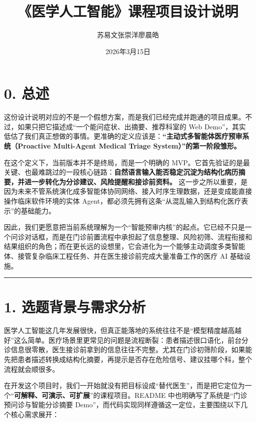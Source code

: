 \documentclass[
  chinese,
  12pt,
  UTF8,
  a4paper]{ctexart}
\title{《医学人工智能》课程项目设计说明}
\author{苏易文\quad 张崇洋\quad 廖晨皓}
\date{2026年3月15日}
\begin{document}
\maketitle

{
\setcounter{tocdepth}{2}
\tableofcontents
}
\section{0. 总述}\label{0-ux5148ux8bf4ux7ed3ux8bbaux6211ux4eecux7684ux7cfbux7edfux5230ux5e95ux505aux4e86ux4ec0ux4e48}

这份设计说明对应的不是一个假想方案，而是我们已经完成并跑通的项目成果。不过，如果只把它描述成``一个能问症状、出摘要、推荐科室的 Web Demo''，其实低估了我们真正想做的事情。更准确的定义应该是：\textbf{``主动式多智能体医疗预审系统（Proactive Multi-Agent Medical Triage System）''的第一阶段雏形。}

在这个定义下，当前版本并不是终局，而是一个明确的 MVP。它首先验证的是最关键、也最难跳过的一段核心链路：\textbf{自然语言输入能否稳定沉淀为结构化病历摘要，并进一步转化为分诊建议、风险提醒和接诊前资料。} 这一步之所以重要，是因为未来不管系统演化成多智能体协同网络、接入时序生理数据，还是变成能直接操作临床软件环境的实体 Agent，都必须先拥有这条``从混乱输入到结构化医疗表示''的基础能力。

因此，我们更愿意把当前系统理解为一个``智能预审内核''的起点。它已经不只是一个问诊对话框，而是在门诊前置流程中承担起了信息整理、风险初筛、流程衔接和结果组织的角色；而在更长远的设想里，它会进化为一个能够主动调度多类智能体、接管复杂临床工程任务、并在医生接诊前完成大量准备工作的医疗 AI 基础设施。

\begin{center}\rule{0.5\linewidth}{0.5pt}\end{center}

\section{1. 选题背景与需求分析}\label{1-ux9009ux9898ux80ccux666fux4e0eux9700ux6c42ux5206ux6790}

医学人工智能这几年发展很快，但真正能落地的系统往往不是``模型精度越高越好''这么简单。医疗场景里更常见的问题是流程断裂：患者描述很口语化，前台分诊信息很零散，医生接诊前拿到的信息往往不完整。尤其在门诊初筛阶段，如果能先把患者描述转换成结构化摘要，再提示是否存在危险信号、建议挂哪个科，整个流程就会顺很多。

在开发这个项目时，我们一开始就没有把目标设成``替代医生''，而是把它定位为一个``\textbf{可解释、可演示、可扩展}''的课程项目。README 中也明确写了系统是``门诊预问诊与智能分诊摘要 Demo''，而代码实现同样遵循这一定位，主要围绕以下几个核心需求展开：
\end{document}
